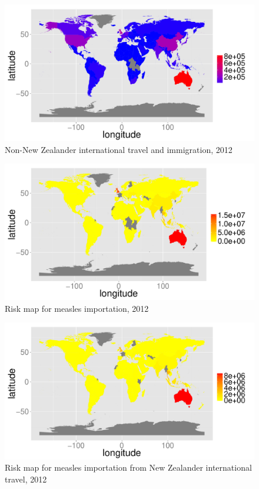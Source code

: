 \documentclass{article}
\begin{document}
\begin{figure}
\begin{center}
\includegraphics{draftfinalreport-041}
\end{center}
\caption{Non-New Zealander international travel and immigration, 2012 }
\label{fig:immigration12}
\end{figure}

\begin{figure}
\begin{center}
\includegraphics{draftfinalreport-042}
\end{center}
\caption{Risk map for measles importation, 2012 }
\label{fig:risk12}
\end{figure}

\begin{figure}
\begin{center}
\includegraphics{draftfinalreport-043}
\end{center}
\caption{Risk map for measles importation from New Zealander international travel, 2012 }
\label{fig:nzrisk12}
\end{figure}
\end{document}
